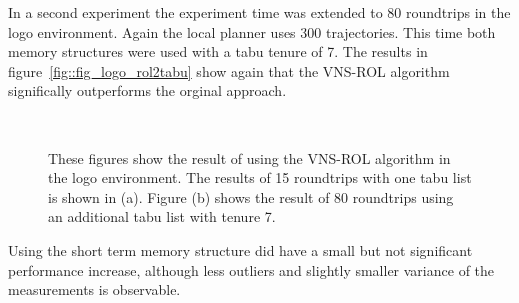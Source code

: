 In a second experiment the experiment time was extended to 80 roundtrips in the logo environment.
Again the local planner uses 300 trajectories.
This time both memory structures were used with a tabu tenure of 7.
The results in figure~\ref{fig::fig_logo_rol2tabu} show again that the VNS-ROL algorithm significally outperforms the orginal approach. 

\begin{figure}[thpb]
   \myfloatalign
    \tiny
    \centering
    \\
    {
    \captionsetup[subfigure]{labelformat=empty} 
    }

    \caption[Experiment: VNS-ROL logo]{These figures show the result of using the VNS-ROL algorithm in the logo environment.
    The results of 15 roundtrips with one tabu list is shown in (a).  Figure (b) shows the result of 80 roundtrips using an additional tabu list with tenure 7.}  
     \label{fig:fig_logo_rol}
\end{figure} 

Using the short term memory structure did have a small but not significant performance increase, although less outliers and slightly smaller variance of the measurements is observable.  

